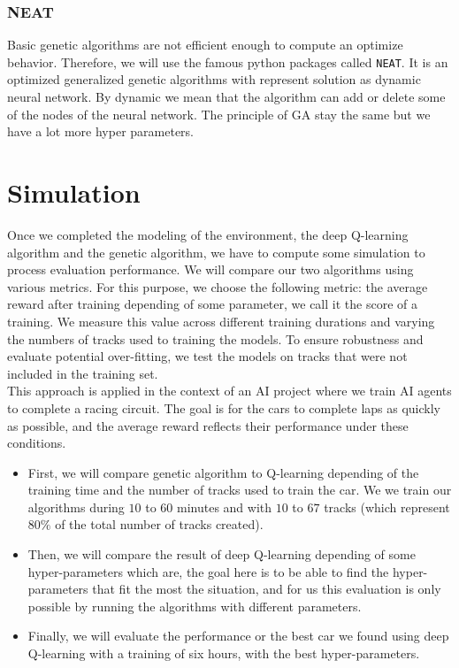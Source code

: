 \documentclass[11pt,a4paper]{article}
\newcommand{\mlist}[1]{\begin{itemize}[noitemsep,topsep=0pt]#1\end{itemize}}
\begin{document}
			\subsubsection*{NEAT}
Basic genetic algorithms are not efficient enough to compute an optimize behavior. Therefore, we will use the famous python packages called \texttt{NEAT}. It is an optimized generalized genetic algorithms with represent solution as dynamic neural network. By dynamic we mean that the algorithm can add or delete some of the nodes of the neural network. The principle of GA stay the same but we have a lot more hyper parameters.
	
	
	\section*{Simulation}
Once we completed the modeling of the environment, the deep Q-learning algorithm and the genetic algorithm, we have to compute some simulation to process evaluation performance. We will compare our two algorithms using various metrics. For this purpose, we choose the following metric: the average reward after training depending of some parameter, we call it the score of a training. We measure this value across different training durations and varying the numbers of tracks used to training the models. To ensure robustness and evaluate potential over-fitting, we test the models on tracks that were not included in the training set.\\
This approach is applied in the context of an AI project where we train AI agents to complete a racing circuit. The goal is for the cars to complete laps as quickly as possible, and the average reward reflects their performance under these conditions.
\mlist{
\item First, we will compare genetic algorithm to Q-learning depending of the training time and the number of tracks used to train the car. We we train our algorithms during $10$ to $60$ minutes and with $10$ to $67$ tracks (which represent $80\%$ of the total number of tracks created).
\item Then, we will compare the result of deep Q-learning depending of some hyper-parameters which are, the goal here is to be able to find the hyper-parameters that fit the most the situation, and for us this evaluation is only possible by running the algorithms with different parameters.
\item Finally, we will evaluate the performance or the best car we found using deep Q-learning with a training of six hours, with the best hyper-parameters.
}
\end{document}
